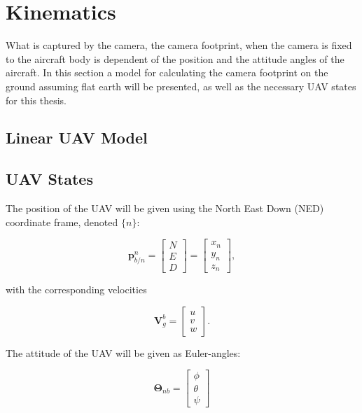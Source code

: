\chapter{Kinematics}
\label{ch:kinematics}

What is captured by the camera, the camera footprint, when the camera is fixed to the aircraft body is dependent of the position and the attitude angles of the aircraft. In this section a model for calculating the camera footprint on the ground assuming flat earth will be presented, as well as the necessary UAV states for this thesis.


\section{Linear UAV Model}



\section{UAV States}

The position of the UAV will be given using the North East Down (NED) coordinate frame, denoted $\{n\}$:

\begin{equation}
	\mathbf{p}_{b/n}^n =
	\begin{bmatrix}
		N \\ E \\ D
	\end{bmatrix}
	=
	\begin{bmatrix}
		x_n \\ y_n \\ z_n
	\end{bmatrix},
\end{equation}

with the corresponding velocities

\begin{equation}
	\mathbf{V}^b_g =
	\begin{bmatrix}
		u \\ v \\ w
	\end{bmatrix}.
\end{equation}

The attitude of the UAV will be given as Euler-angles:

\begin{equation}
	\bm{\Theta}_{nb} =
	\begin{bmatrix}
		\phi \\ \theta \\ \psi
	\end{bmatrix}	
\end{equation}


